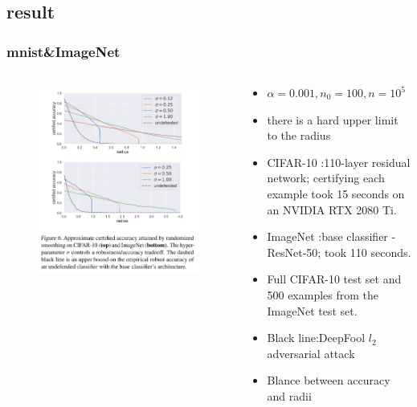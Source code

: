 \documentclass[aspectratio=169%
,serif,mathserif]{beamer}
\begin{document}
\subsection{result}
\begin{frame}
	\frametitle{mnist\&ImageNet}
	\begin{columns}
		\begin{column}{.4\textwidth}
			\begin{figure}[htbp]
				\includegraphics[width=.8\linewidth]{16.png}
			\end{figure}
		\end{column}

		\begin{column}{.6\textwidth}
			\begin{itemize}
				\item $\alpha = 0.001,n_0 = 100, n = 10^5$
				\item there is a hard upper limit to the radius
				\item CIFAR-10 :110-layer residual network; certifying each example took 15 seconds on an NVIDIA RTX 2080 Ti. 
				\item ImageNet :base classifier - ResNet-50; took 110 seconds.
				\item Full CIFAR-10 test set and 500 examples from the ImageNet test set.
				\item Black line:DeepFool $l_2$ adversarial attack
				\item Blance between accuracy and radii 
			\end{itemize}
		\end{column}
	\end{columns}	
\end{frame}
\end{document}
